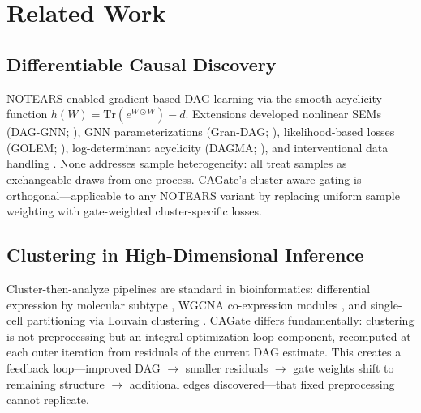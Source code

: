 \documentclass[12pt,a4paper]{article}
\begin{document}




\section{Related Work}









\subsection{Differentiable Causal Discovery}









NOTEARS \cite{Zheng2018} enabled gradient-based DAG learning via the smooth acyclicity function $h(W) = \text{Tr}(e^{W \odot W}) - d$. Extensions developed nonlinear SEMs (DAG-GNN; \cite{Yu2019}), GNN parameterizations (Gran-DAG; \cite{Lachapelle2020}), likelihood-based losses (GOLEM; \cite{Ng2020}), log-determinant acyclicity (DAGMA; \cite{Bello2022}), and interventional data handling \cite{Brouillard2020}. None addresses sample heterogeneity: all treat samples as exchangeable draws from one process. CAGate's cluster-aware gating is orthogonal---applicable to any NOTEARS variant by replacing uniform sample weighting with gate-weighted cluster-specific losses.









\subsection{Clustering in High-Dimensional Inference}









Cluster-then-analyze pipelines are standard in bioinformatics: differential expression by molecular subtype \cite{Tibshirani2005}, WGCNA co-expression modules \cite{Langfelder2008}, and single-cell partitioning via Louvain clustering \cite{Traag2019}. CAGate differs fundamentally: clustering is not preprocessing but an integral optimization-loop component, recomputed at each outer iteration from residuals of the current DAG estimate. This creates a feedback loop---improved DAG $\to$ smaller residuals $\to$ gate weights shift to remaining structure $\to$ additional edges discovered---that fixed preprocessing cannot replicate.
\end{document}
